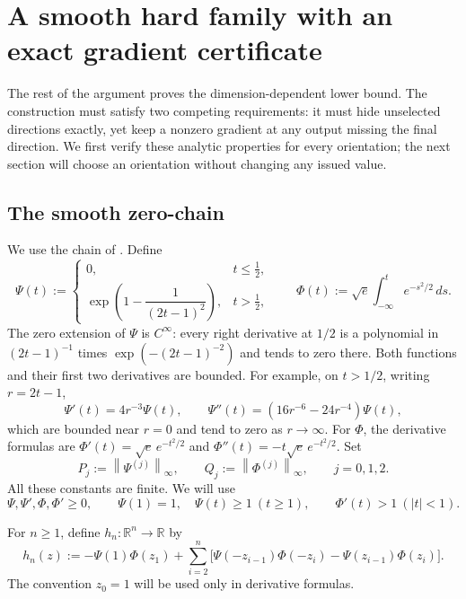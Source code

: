 \documentclass[11pt]{article}
\numberwithin{equation}{section}
\theoremstyle{definition}
\theoremstyle{remark}
\newcommand{\R}{\mathbb{R}}
\newcommand{\norm}[1]{\left\lVert #1\right\rVert}
\begin{document}
\section{A smooth hard family with an exact gradient certificate}
\label{sec:family}

The rest of the argument proves the dimension-dependent lower bound.
The construction must satisfy two competing requirements: it must hide
unselected directions exactly, yet keep a nonzero gradient at any output
missing the final direction. We first verify these analytic properties
for every orientation; the next section will choose an orientation without
changing any issued value.

\subsection{The smooth zero-chain}

We use the chain of \citet[Section~4]{CDHS2020}. Define
\begin{equation}
 \Psi(t):=
 \begin{cases}
 0,&t\leq\tfrac12,\\[1mm]
 \exp\!\left(1-\dfrac{1}{(2t-1)^2}\right),&t>\tfrac12,
 \end{cases}
 \qquad
 \Phi(t):=\sqrt e\int_{-\infty}^{t}e^{-s^2/2}\,ds.
 \label{eq:psi-phi}
\end{equation}
The zero extension of $\Psi$ is $C^\infty$: every right derivative at
$1/2$ is a polynomial in $(2t-1)^{-1}$ times
$\exp(-(2t-1)^{-2})$ and tends to zero there. Both functions and their first
two derivatives are bounded. For example, on $t>1/2$, writing $r=2t-1$,
\[
    \Psi'(t)=4r^{-3}\Psi(t),\qquad
    \Psi''(t)=(16r^{-6}-24r^{-4})\Psi(t),
\]
which are bounded near $r=0$ and tend to zero as $r\to\infty$.
For $\Phi$, the derivative formulas are
$\Phi'(t)=\sqrt e\,e^{-t^2/2}$ and
$\Phi''(t)=-t\sqrt e\,e^{-t^2/2}$.
Set
\begin{equation}
    P_j:=\norm{\Psi^{(j)}}_\infty,\qquad
    Q_j:=\norm{\Phi^{(j)}}_\infty,\qquad j=0,1,2.
    \label{eq:PQ}
\end{equation}
All these constants are finite. We will use
\begin{equation}
 \Psi,\Psi',\Phi,\Phi'\geq0,\qquad
 \Psi(1)=1,\quad \Psi(t)\geq1\ (t\geq1),\qquad
 \Phi'(t)>1\ (|t|<1).
 \label{eq:properties}
\end{equation}

For $n\geq1$, define $h_n:\R^n\to\R$ by
\begin{equation}
    h_n(z):=-\Psi(1)\Phi(z_1)
      +\sum_{i=2}^{n}\bigl[
       \Psi(-z_{i-1})\Phi(-z_i)-\Psi(z_{i-1})\Phi(z_i)\bigr].
    \label{eq:chain}
\end{equation}
The convention $z_0=1$ will be used only in derivative formulas.
\end{document}
